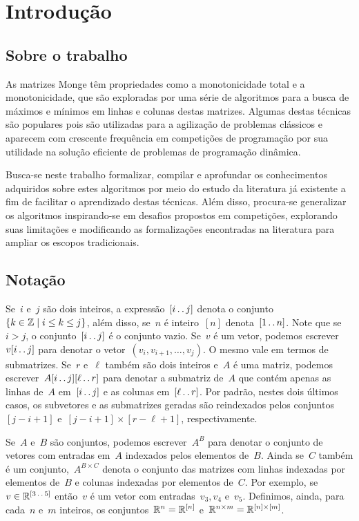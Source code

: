 \section{Introdução}
\label{Introducao}

\subsection{Sobre o trabalho}
As matrizes Monge têm propriedades como a monotonicidade total e a monotonicidade, que são exploradas por uma série de algoritmos para a busca de máximos e mínimos em linhas e colunas destas matrizes. Algumas destas técnicas são populares pois são utilizadas para a agilização de problemas clássicos e aparecem com crescente frequência em competições de programação por sua utilidade na solução eficiente de problemas de programação dinâmica.

Busca-se neste trabalho formalizar, compilar e aprofundar os conhecimentos adquiridos sobre estes algoritmos por meio do estudo da literatura já existente a fim de facilitar o aprendizado destas técnicas. Além disso, procura-se generalizar os algoritmos inspirando-se em desafios propostos em competições, explorando suas limitações e modificando as formalizações encontradas na literatura para ampliar os escopos tradicionais. 

\subsection{Notação}
Se~$i$ e~$j$ são dois inteiros, a expressão~$[i \,.\,.\, j]$ denota o conjunto~${ \{ k \in \mathbb{Z} \mid i \leq k \leq j \} }$, além disso, se~$n$ é inteiro~$[n]$ denota~$[1 \,.\,.\, n]$. Note que se~$i > j$, o conjunto~$[i \,.\,.\, j]$ é o conjunto vazio. Se~$v$ é um vetor, podemos escrever~$v[i \,.\,.\, j]$ para denotar o vetor~${ (v_i, v_{i+1}, \dots, v_j) }$. O mesmo vale em termos de submatrizes. Se~$r$ e~$\ell$ também são dois inteiros e~$A$ é uma matriz, podemos escrever~$A[i \,.\,.\, j][\ell \,.\,.\, r]$ para denotar a submatriz de~$A$ que contém apenas as linhas de~$A$ em~$[i \,.\,.\, j]$ e as colunas em~$[\ell \,.\,.\, r]$. Por padrão, nestes dois últimos casos, os subvetores e as submatrizes geradas são reindexados pelos conjuntos~$[j - i + 1]$ e~${ [j - i + 1] \times [r - \ell + 1] }$, respectivamente.

Se~$A$ e~$B$ são conjuntos, podemos escrever~$A^B$ para denotar o conjunto de vetores com entradas em~$A$ indexados pelos elementos de~$B$. Ainda se~$C$ também é um conjunto,~$A^{B \times C}$ denota o conjunto das matrizes com linhas indexadas por elementos de~$B$ e colunas indexadas por elementos de~$C$. Por exemplo, se~$v \in \mathbb{R}^{ [3 \,.\,.\, 5] }$ então~$v$ é um vetor com entradas~${ v_3, v_4 }$ e~$v_5$. Definimos, ainda, para cada~$n$ e~$m$ inteiros, os conjuntos~${ \mathbb{R}^n = \mathbb{R}^{ [n] } }$ e~${ \mathbb{R}^{n \times m} = \mathbb{R}^{[n] \times [m]} }$.

